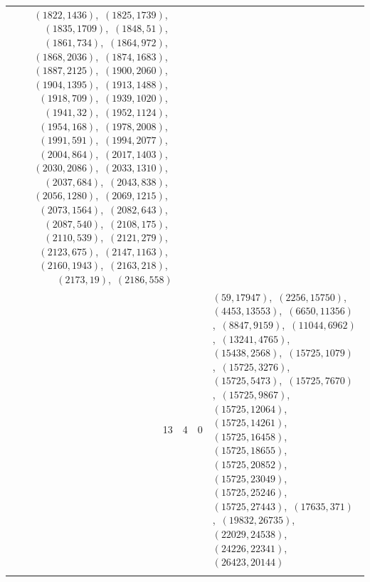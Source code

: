 \documentclass[11pt]{article}
\begin{document}
\begin{longtable}{@{}rrl>{\raggedright\arraybackslash}p{}@{}}
$(1822,1436)$,\allowbreak\ $(1825,1739)$,\allowbreak\ $(1835,1709)$,\allowbreak\ $(1848,51)$,\allowbreak\ $(1861,734)$,\allowbreak\ $(1864,972)$,\allowbreak\ $(1868,2036)$,\allowbreak\ $(1874,1683)$,\allowbreak\ $(1887,2125)$,\allowbreak\ $(1900,2060)$,\allowbreak\ $(1904,1395)$,\allowbreak\ $(1913,1488)$,\allowbreak\ $(1918,709)$,\allowbreak\ $(1939,1020)$,\allowbreak\ $(1941,32)$,\allowbreak\ $(1952,1124)$,\allowbreak\ $(1954,168)$,\allowbreak\ $(1978,2008)$,\allowbreak\ $(1991,591)$,\allowbreak\ $(1994,2077)$,\allowbreak\ $(2004,864)$,\allowbreak\ $(2017,1403)$,\allowbreak\ $(2030,2086)$,\allowbreak\ $(2033,1310)$,\allowbreak\ $(2037,684)$,\allowbreak\ $(2043,838)$,\allowbreak\ $(2056,1280)$,\allowbreak\ $(2069,1215)$,\allowbreak\ $(2073,1564)$,\allowbreak\ $(2082,643)$,\allowbreak\ $(2087,540)$,\allowbreak\ $(2108,175)$,\allowbreak\ $(2110,539)$,\allowbreak\ $(2121,279)$,\allowbreak\ $(2123,675)$,\allowbreak\ $(2147,1163)$,\allowbreak\ $(2160,1943)$,\allowbreak\ $(2163,218)$,\allowbreak\ $(2173,19)$,\allowbreak\ $(2186,558)$\\
13 & 4 & $0$ & $(59,17947)$,\allowbreak\ $(2256,15750)$,\allowbreak\ $(4453,13553)$,\allowbreak\ $(6650,11356)$,\allowbreak\ $(8847,9159)$,\allowbreak\ $(11044,6962)$,\allowbreak\ $(13241,4765)$,\allowbreak\ $(15438,2568)$,\allowbreak\ $(15725,1079)$,\allowbreak\ $(15725,3276)$,\allowbreak\ $(15725,5473)$,\allowbreak\ $(15725,7670)$,\allowbreak\ $(15725,9867)$,\allowbreak\ $(15725,12064)$,\allowbreak\ $(15725,14261)$,\allowbreak\ $(15725,16458)$,\allowbreak\ $(15725,18655)$,\allowbreak\ $(15725,20852)$,\allowbreak\ $(15725,23049)$,\allowbreak\ $(15725,25246)$,\allowbreak\ $(15725,27443)$,\allowbreak\ $(17635,371)$,\allowbreak\ $(19832,26735)$,\allowbreak\ $(22029,24538)$,\allowbreak\ $(24226,22341)$,\allowbreak\ $(26423,20144)$\\
\addlinespace[3pt]
\end{longtable}
\endgroup
\end{document}
